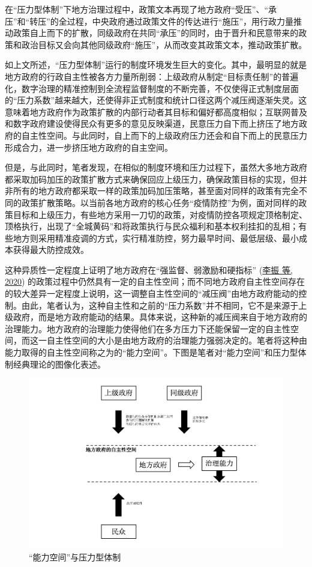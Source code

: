 \documentclass[
  12pt,
]{ctexart}
\begin{document}
在``压力型体制''下地方治理过程中，政策文本再现了地方政府``受压''、``承压''和``转压''的全过程，中央政府通过政策文件的传达进行``施压''，用行政力量推动政策自上而下的扩散，同级政府在共同``承压''的同时，由于晋升和民意带来的政策和政治目标又会向其他同级政府``施压''，从而改变其政策文本，推动政策扩散。

如上文所述，``压力型体制''运行的制度环境发生巨大的变化。其中，最明显的就是地方政府的行政自主性被各方力量所削弱：上级政府从制定``目标责任制''的普遍化，数字治理的精准控制到全流程监督制度的不断完善，不仅使得正式制度层面的``压力系数''越来越大，还使得非正式制度和统计口径这两个减压阀逐渐失灵。这意味着地方政府作为政策扩散的内部行动者其目标和偏好都高度相似；互联网普及和数字政府建设使得民众有更多的意见反映渠道，民意压力自下而上挤压了地方政府的自主性空间。与此同时，自上而下的上级政府压力还会和自下而上的民意压力形成合力，进一步挤压地方政府的自主空间。

但是，与此同时，笔者发现，在相似的制度环境和压力过程下，虽然大多地方政府都采取加码加压的政策扩散方式来确保回应上级压力，确保政策目标的实现，但并非所有的地方政府都采取一样的政策加码加压策略，甚至面对同样的政策有完全不同的政策扩散策略。以当前各地方政府的核心任务``疫情防控''为例，面对同样的政策目标和上级压力，有些地方采用一刀切的政策，对疫情防控各项规定顶格制定、顶格执行，出现了``全城黄码''和将政策执行与民众福利和基本权利挂扣的乱相；有些地方则采用精准疫调的方式，实行精准防控，努力最早时间、最低层级、最小成本获得最大防控成效。

这种异质性一定程度上证明了地方政府在``强监督、弱激励和硬指标'' (\protect\hyperlink{ref-LiZhenEtAl2020}{李振 等, 2020}) 的政策过程中仍然具有一定的自主性空间；而不同地方政府自主性空间存在的较大差异一定程度上说明，这一调整自主性空间的``减压阀''由地方政府能动的控制。由此，笔者认为，这种自主性和之前的``压力系数''并不相同，它不是来源于上级政府，而是地方政府能动的结果。具体来说，这种新的减压阀来自于地方政府的治理能力。地方政府的治理能力使得他们在多方压力下还能保留一定的自主性空间，而这一自主性空间的大小是由地方政府的治理能力强弱决定的。笔者将这种由能力取得的自主性空间称之为的``能力空间''。下图是笔者对``能力空间''和压力型体制经典理论的图像化表述。

\begin{figure}
\includegraphics[width=1\linewidth]{../figures/figure2} \caption{“能力空间”与压力型体制}\label{fig:unnamed-chunk-1}
\end{figure}
\end{document}
